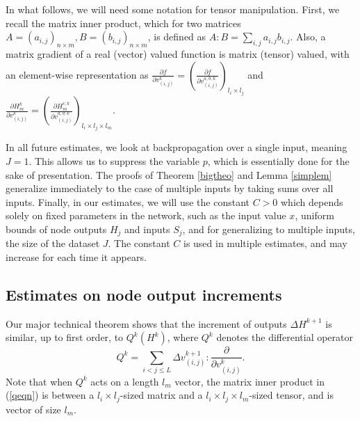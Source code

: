 \documentclass{jcmlatex}
\begin{document}
In what follows, we will need some notation for  tensor manipulation.   First, we recall  the matrix inner product, which for two matrices $A = (a_{i,j})_{n\times m}, B = (b_{i,j})_{n\times
m}$, is defined as $A:B = \sum_{i,j} a_{i,j}b_{i,j}$. Also, a matrix gradient
of a real (vector) valued function is matrix (tensor) valued, with an element-wise
representation as  $\frac{\partial f }{\partial v_{(i,j)}^k} = \left(\frac{\partial
f }{\partial v_{(i,j)}^{a,b;k}}\right)_{l_i\times l_j}$ and $\frac{\partial
H_m^k }{\partial v_{(i,j)}^k}= \left(\frac{\partial H_m^{c;k} }{\partial
v_{(i,j)}^{a,b;k}}\right)_{l_i\times l_j\times l_m}$.  

In all future estimates, we look at backpropagation over a single input, meaning $J = 1$. This allows us to suppress the variable $p$, which is essentially done for the sake of presentation.  The proofs of Theorem \ref{bigtheo} and Lemma \ref{simplem} generalize immediately to the case of multiple inputs by taking sums over all inputs. Finally, in our estimates, we will use the constant $C>0$ which depends solely on fixed parameters in the network, such as the input value $x$, uniform bounds of node outputs $H_j$ and inputs $S_j$, and for generalizing to multiple inputs, the size of the dataset $J$. The constant $C$ is used in multiple estimates, and may increase for each time it appears.

\subsection{Estimates on node output increments}

Our  major technical theorem shows that the increment of outputs $\Delta H^{k+1}$   is
similar, up to first order, to $Q^k(H^k)$, where  $Q^k$ denotes the differential operator
\begin{equation}\label{qeqn}
Q^k =\sum_{i<j\le L}  \Delta v_{(i,j)}^{k+1}:\frac{\partial }{\partial v_{(i,j)}^{k}}.
\end{equation}  
Note that when $Q^k$ acts on a  length $l_m$ vector, the matrix inner product in (\ref{qeqn})
is between a $l_i \times l_j$-sized matrix and a $l_i\times l_j \times l_m$-sized tensor, and is vector of size $l_m$.
\end{document}
